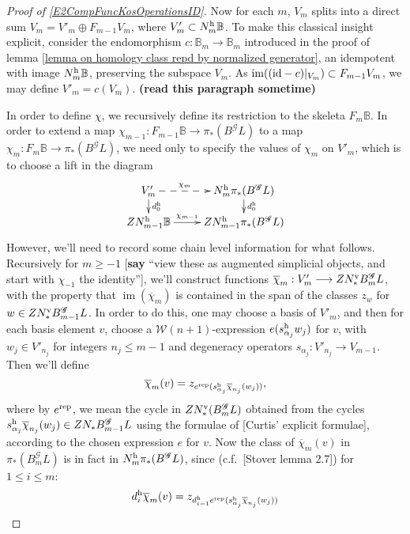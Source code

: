 \documentclass[11pt]{amsart}
\theoremstyle{plain}
\theoremstyle{definition}
\DeclareMathOperator{\im}{im}
\renewcommand{\to}{\longrightarrow}
\newcommand{\scrG}{\mathscr{G}}
\newcommand{\calW}{\mathcal{W}}
\theoremstyle{plain}
\newcommand{\BSW}{{\scrG}}
\newcommand{\BSWres}{B^\BSW}%
\newcommand{\Id}{\textup{id}}
\begin{document}
\begin{Composite functor spectral sequences}
\begin{tricky proofs of operation compatibilities}
\begin{proof}[Proof of \ref{E2CompFuncKosOperationsID}]
Now for each $m$, $V_m$ splits into a direct sum
$V_m=V'_m\oplus F_{m-1}V_m$,
where $V'_m\subset N_m^\textup{h}\mathbb{B}$. To make this classical insight explicit, consider the endomorphism $c:\mathbb{B}_m\to \mathbb{B}_m$ introduced in the proof of lemma \ref{lemma on homology class repd by normalized generator}, an idempotent with image $N_m^\textup{h}\mathbb{B}$, preserving the subspace $V_m$. As $\im((\Id-c)|_{V_m})\subset F_{m-1}V_m$, we may define $V'_m=c(V_m)$. \textbf{(read this paragraph sometime)}

In order to define $\chi$, we recursively define its restriction to the skeleta $F_m\mathbb{B}$. In order to extend a map $\chi_{m-1}:F_{m-1}\mathbb{B}\to \pi_*(\BSWres L)$ to a map $\chi_m:F_m\mathbb{B}\to \pi_*(\BSWres L)$, we need only to specify the values of $\chi_m$ on $V'_m$, which is to choose a lift in the diagram
\[\xymatrix@R=4mm{
V'_m\ar@{-->}[r]^-{\chi_m}
\ar[d]^-{d_0^\textup{h}}
&%
N^\textup{h}_m\pi_*(\BSWres L)\ar[d]^-{d_0^\textup{h}}
\\%
ZN^\textup{h}_{m-1}\mathbb{B}\ar[r]^-{\chi_{m-1}}
&%
ZN^\textup{h}_{m-1}\pi_*(\BSWres L)%
}\]
However, we'll need to record some chain level information for what follows. Recursively for $m\geq-1$ [\textbf{say} ``view these as augmented simplicial objects, and start with $\chi_{-1}$ the identity''], we'll construct functions $\overline{\chi}_m:V'_m\to ZN^\textup{v}_*\BSWres_m L$, with the property that $\im(\overline{\chi}_m)$ is contained in the span of the classes $z_{w}$ for $w\in ZN^\textup{v}_*\BSWres_{m-1}L$. In order to do this, one may choose a basis of $V'_m$, and then for each basis element $v$, choose a $\calW(n+1)$-expression $e(s^\textup{h}_{\alpha_j}w_j)$ for $v$, with $w_j\in V'_{n_j}$ for integers $n_j\leq m-1$ and degeneracy operators $s_{\alpha_j}:V'_{n_j}\to V_{m-1}$. Then we'll define
\[\overline{\chi}_m(v)=z_{e^\textup{rep}(s^\textup{h}_{\alpha_j}\overline{\chi}_{n_j}(w_j))},\]
where by $e^\textup{rep}$, we mean the cycle in $ZN_*^\textup{v}(\BSWres_mL)$ obtained from the cycles $s^\textup{h}_{\alpha_j}\overline{\chi}_{n_j}(w_j)\in ZN_*\BSWres_{m-1}L$ using the formulae of [Curtis' explicit formulae], according to the chosen expression $e$ for $v$.
Now the class of $\overline{\chi}_m(v)$ in $\pi_*(\BSWres_mL)$ is in fact in $N^\textup{h}_m\pi_*(\BSWres L)$, since (c.f.\ [Stover lemma 2.7]) for $1\leq i \leq m$:
\[d_i^\textup{h}\overline{\chi}_m(v) =z_{d^\textup{h}_{i-1}e^\textup{rep}(s^\textup{h}_{\alpha_j}\overline{\chi}_{n_j}(w_j))}\]

\end{proof}
\end{tricky proofs of operation compatibilities}
\end{Composite functor spectral sequences}
\end{document}
